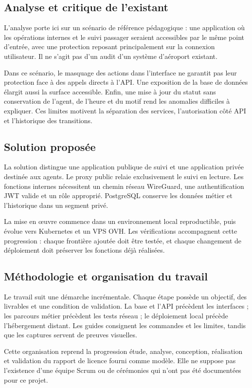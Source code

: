 \documentclass[11pt]{extarticle}
\begin{document}
\subsection{Analyse et critique de l'existant}
L'analyse porte ici sur un scénario de référence pédagogique : une application où les opérations internes et le suivi passager seraient accessibles par le même point d'entrée, avec une protection reposant principalement sur la connexion utilisateur. Il ne s'agit pas d'un audit d'un système d'aéroport existant.

Dans ce scénario, le masquage des actions dans l'interface ne garantit pas leur protection face à des appels directs à l'API. Une exposition de la base de données élargit aussi la surface accessible. Enfin, une mise à jour du statut sans conservation de l'agent, de l'heure et du motif rend les anomalies difficiles à expliquer. Ces limites motivent la séparation des services, l'autorisation côté API et l'historique des transitions.
\subsection{Solution proposée}
La solution distingue une application publique de suivi et une application privée destinée aux agents. Le proxy public relaie exclusivement le suivi en lecture. Les fonctions internes nécessitent un chemin réseau WireGuard, une authentification JWT valide et un rôle approprié. PostgreSQL conserve les données métier et l'historique dans un segment privé.

La mise en œuvre commence dans un environnement local reproductible, puis évolue vers Kubernetes et un VPS OVH. Les vérifications accompagnent cette progression : chaque frontière ajoutée doit être testée, et chaque changement de déploiement doit préserver les fonctions déjà réalisées.
\subsection{Méthodologie et organisation du travail}
Le travail suit une démarche incrémentale. Chaque étape possède un objectif, des livrables et une condition de validation. La base et l'API précèdent les interfaces ; les parcours métier précèdent les tests réseau ; le déploiement local précède l'hébergement distant. Les guides consignent les commandes et les limites, tandis que les captures servent de preuves visuelles.

Cette organisation reprend la progression étude, analyse, conception, réalisation et validation du rapport de licence fourni comme modèle. Elle ne suppose pas l'existence d'une équipe Scrum ou de cérémonies qui n'ont pas été documentées pour ce projet.
\end{document}
